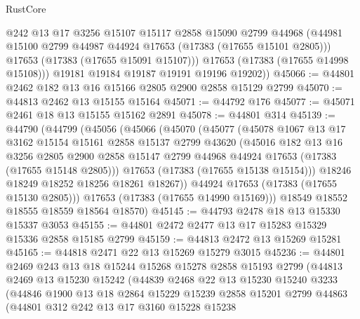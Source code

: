 \begin{lexlean}{RustCore}
\begin{coremodule}
            @242
            @13
            @17
            @3256
            @15107
            @15117
            @2858
            @15090
            @2799
            @44968
            (@44981 @15100 @2799 @44987 @44924 @17653 (@17383 (@17655 @15101 @2805)))
            @17653
            (@17383 (@17655 @15091 @15107)))
          @17653
          (@17383 (@17655 @14998 @15108)))
        @19181
        @19184
        @19187
        @19191
        @19196
        @19202))
@45066 := @44801 @2462 @182 @13 @16 @15166 @2805 @2900 @2858 @15129 @2799
@45070 := @44813 @2462 @13 @15155 @15164
@45071 := @44792 @176
@45077 := @45071 @2461 @18 @13 @15155 @15162 @2891
@45078 := @44801 @314
@45139 := @44790
    (@44799
      (@45056
        (@45066
          (@45070
            (@45077
              (@45078
                @1067
                @13
                @17
                @3162
                @15154
                @15161
                @2858
                @15137
                @2799
                @43620
                (@45016
                  @182
                  @13
                  @16
                  @3256
                  @2805
                  @2900
                  @2858
                  @15147
                  @2799
                  @44968
                  @44924
                  @17653
                  (@17383 (@17655 @15148 @2805)))
                @17653
                (@17383 (@17655 @15138 @15154)))
              @18246
              @18249
              @18252
              @18256
              @18261
              @18267))
          @44924
          @17653
          (@17383 (@17655 @15130 @2805)))
        @17653
        (@17383 (@17655 @14990 @15169)))
      @18549
      @18552
      @18555
      @18559
      @18564
      @18570)
@45145 := @44793 @2478 @18 @13 @15330 @15337 @3053
@45155 := @44801 @2472 @2477 @13 @17 @15283 @15329 @15336 @2858 @15185 @2799
@45159 := @44813 @2472 @13 @15269 @15281
@45165 := @44818 @2471 @22 @13 @15269 @15279 @3015
@45236 := @44801
    @2469
    @243
    @13
    @18
    @15244
    @15268
    @15278
    @2858
    @15193
    @2799
    (@44813
      @2469
      @13
      @15230
      @15242
      (@44839
        @2468
        @22
        @13
        @15230
        @15240
        @3233
        (@44846
          @1900
          @13
          @18
          @2864
          @15229
          @15239
          @2858
          @15201
          @2799
          @44863
          (@44801
            @312
            @242
            @13
            @17
            @3160
            @15228
            @15238

\end{coremodule}
\end{lexlean}
